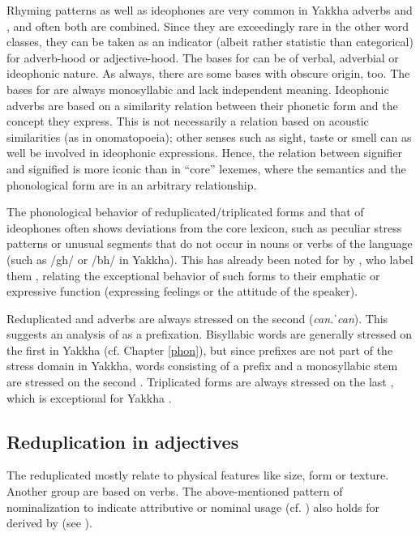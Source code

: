 Rhyming patterns as well as ideophones are very common in Yakkha adverbs and , and often both are combined. Since they are exceedingly rare in the other word classes, they can be taken as an indicator (albeit rather statistic than categorical) for adverb-hood or adjective-hood. The bases for  can be of verbal, adverbial or ideophonic nature. As always, there are some  bases with obscure origin, too. The bases for  are always monosyllabic and lack independent meaning. Ideophonic adverbs are based on a similarity relation between their phonetic form and the concept they express. This is not necessarily a relation based on acoustic similarities (as in onomatopoeia); other senses such as sight, taste or smell can as well be involved in ideophonic expressions. Hence, the relation between signifier and signified is more iconic than in “core” lexemes, where the semantics and the phonological form are in an arbitrary relationship.

The phonological behavior of reduplicated/triplicated forms and that of ideophones often shows deviations from the core lexicon, such as peculiar stress patterns or unusual segments that do not occur in nouns or verbs of the language (such as /gh/ or /bh/ in Yakkha). This has already been noted for  by \citet{Raietal1997Triplicated}, who label them , relating the exceptional behavior of such forms to their emphatic or expressive function (expressing feelings or the attitude of the speaker). 

Reduplicated  and adverbs are always stressed on the second  (\emph{can.ˈcan}). This suggests an analysis of  as a prefixation. Bisyllabic words are generally stressed on the first  in Yakkha (cf. Chapter \ref{phon}), but since prefixes are not part of the stress domain in Yakkha, words consisting of a prefix and a monosyllabic stem are stressed on the second . Triplicated forms are always stressed on the last , which is exceptional for Yakkha . 

\subsection{Reduplication in adjectives}

The reduplicated  mostly relate to physical features like size, form or texture. Another group are   based on  verbs. The above-mentioned pattern of nominalization to indicate attributive or nominal usage (cf. ) also holds for  derived by  (see \Next). 

